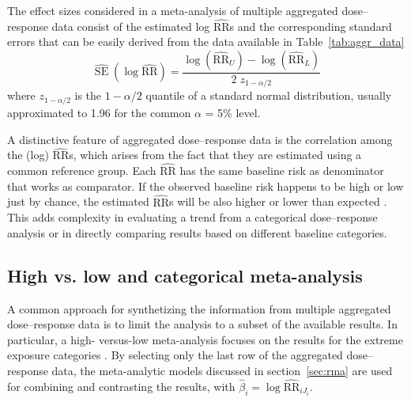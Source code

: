 \documentclass[11pt,a4paper,twoside,openany]{book}\usepackage{knitr}
\DeclareMathOperator{\SE}{SE}
\begin{document}
{{%
The effect sizes considered in a meta-analysis of multiple aggregated dose--response data consist of the estimated log $\widehat{\mathrm{RR}}$s and the corresponding standard errors that can be easily derived from the data available in Table~\ref{tab:aggr_data}
\begin{equation}
\widehat{\SE} \left( \log \widehat{\mathrm{RR}} \right) = \frac{\log \left(\widehat{\mathrm{RR}}_U \right) - \log \left(\widehat{\mathrm{RR}}_L \right)}{2\; z_{1- \alpha/2}}
\label{eq:se_logrr}
\end{equation} 
\noindent where $z_{1- \alpha/2}$ is the $1- \alpha/2$ quantile of a standard normal distribution, usually approximated to 1.96 for the common $\alpha$ = 5\% level.

A distinctive feature of aggregated dose--response data is the correlation among the (log) $\widehat{\mathrm{RR}}$s, which arises from the fact that they are estimated using a common reference group. Each $\widehat{\mathrm{RR}}$ has the same baseline risk as denominator that works as comparator. If the observed baseline risk happens to be high or low just by chance, the estimated $\widehat{\mathrm{RR}}$s will be also higher or lower than expected \citep{schmid1998empirical}. This adds complexity in evaluating a trend from a categorical dose--response analysis or in directly comparing results based on different baseline categories. 

\subsection{High vs. low and categorical meta-analysis}

A common approach for synthetizing the information from multiple aggregated dose--response data is to limit the analysis to a subset of the available results. In particular, a high- versus-low meta-analysis focuses on the results for the extreme exposure categories \citep{yu2013empirical}. By selecting only the last row of the aggregated dose--response data, the meta-analytic models discussed in section~\ref{sec:rma} are used for combining and contrasting the results, with $\hat \beta_i = \log \widehat{\mathrm{RR}}_{iJ_i}$. 

}}
\end{document}
